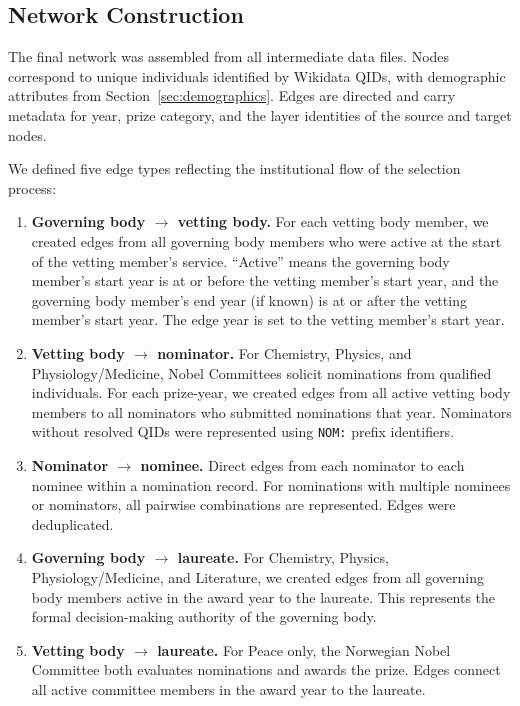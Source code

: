 \subsection{Network Construction}\label{sec:network}

The final network was assembled from all intermediate data files. Nodes
correspond to unique individuals identified by Wikidata QIDs, with
demographic attributes from Section~\ref{sec:demographics}. Edges are
directed and carry metadata for year, prize category, and the layer
identities of the source and target nodes.

We defined five edge types reflecting the institutional flow of the
selection process:

\begin{enumerate}
    \item \textbf{Governing body $\to$ vetting body.} For each vetting
    body member, we created edges from all governing body members who were
    active at the start of the vetting member's service. ``Active'' means
    the governing body member's start year is at or before the vetting
    member's start year, and the governing body member's end year (if known)
    is at or after the vetting member's start year. The edge year is set to
    the vetting member's start year.

    \item \textbf{Vetting body $\to$ nominator.} For Chemistry, Physics,
    and Physiology/Medicine, Nobel Committees solicit nominations from
    qualified individuals. For each prize-year, we created edges from all
    active vetting body members to all nominators who submitted nominations
    that year. Nominators without resolved QIDs were represented using
    \texttt{NOM:} prefix identifiers.

    \item \textbf{Nominator $\to$ nominee.} Direct edges from each
    nominator to each nominee within a nomination record. For nominations
    with multiple nominees or nominators, all pairwise combinations are
    represented. Edges were deduplicated.

    \item \textbf{Governing body $\to$ laureate.} For Chemistry, Physics,
    Physiology/Medicine, and Literature, we created edges from all governing
    body members active in the award year to the laureate. This represents
    the formal decision-making authority of the governing body.

    \item \textbf{Vetting body $\to$ laureate.} For Peace only, the
    Norwegian Nobel Committee both evaluates nominations and awards the
    prize. Edges connect all active committee members in the award year
    to the laureate.
\end{enumerate}

